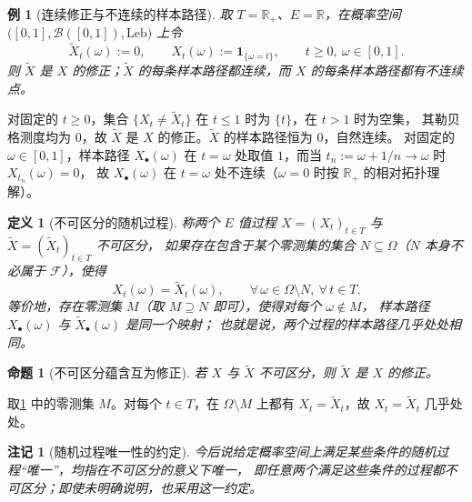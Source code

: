 \documentclass[UTF8,11pt,a4paper,oneside,fontset=fandol]{ctexrep}
\makeatletter
\numberwithin{equation}{section}
\theoremstyle{zhthm}
\newtheorem{proposition}[theorem]{命题}
\newtheorem{definition}[theorem]{定义}
\newtheorem{example}[theorem]{例}
\newtheorem{remark}[theorem]{注记}
\renewenvironment{proof}[1][\proofname]{\par
  \pushQED{\qed}%
  \normalfont\topsep6\p@\@plus6\p@\relax
  \trivlist
  \item[\hskip\labelsep\bfseries#1\hspace{0.5em}]\ignorespaces
}{%
  \popQED\endtrivlist\@endpefalse
}
\renewcommand{\proofname}{证明}
\newcommand{\R}{\mathbb{R}}
\newcommand{\B}{\mathcal{B}}
\newcommand{\F}{\mathcal{F}}
\newcommand{\Leb}{\mathrm{Leb}}
\newcommand{\ind}[1]{\mathbf{1}_{#1}}
\makeatother
\begin{document}
\begin{example}[连续修正与不连续的样本路径]
\label{ex:modification-spike-paths}
取 $T=\R_+$、$E=\R$，在概率空间 $\bigl([0,1],\B([0,1]),\Leb\bigr)$ 上令
\[
  \widetilde X_t(\omega):=0,\qquad X_t(\omega):=\ind{\{\omega=t\}},\qquad t\ge0,\ \omega\in[0,1].
\]
则 $\widetilde X$ 是 $X$ 的修正；$\widetilde X$ 的每条样本路径都连续，而 $X$ 的每条样本路径都有不连续点。
\end{example}

\begin{proof}
对固定的 $t\ge0$，集合 $\{X_t\ne\widetilde X_t\}$ 在 $t\le1$ 时为 $\{t\}$，在 $t>1$ 时为空集，
其勒贝格测度均为 $0$，故 $\widetilde X$ 是 $X$ 的修正。$\widetilde X$ 的样本路径恒为 $0$，自然连续。
对固定的 $\omega\in[0,1]$，样本路径 $X_\bullet(\omega)$ 在 $t=\omega$ 处取值 $1$，而当 $t_n:=\omega+1/n\to\omega$ 时 $X_{t_n}(\omega)=0$，
故 $X_\bullet(\omega)$ 在 $t=\omega$ 处不连续（$\omega=0$ 时按 $\R_+$ 的相对拓扑理解）。
\end{proof}

\begin{definition}[不可区分的随机过程]
\label{def:indistinguishable-processes}
称两个 $E$ 值过程 $X=(X_t)_{t\in T}$ 与 $\widetilde X=(\widetilde X_t)_{t\in T}$ 不可区分，
如果存在包含于某个零测集的集合 $N\subseteq\Omega$（$N$ 本身不必属于 $\F$），使得
\[
  X_t(\omega)=\widetilde X_t(\omega),\qquad \forall\,\omega\in\Omega\setminus N,\ \forall\,t\in T.
\]
等价地，存在零测集 $M$（取 $M\supseteq N$ 即可），使得对每个 $\omega\notin M$，
样本路径 $X_\bullet(\omega)$ 与 $\widetilde X_\bullet(\omega)$ 是同一个映射；
也就是说，两个过程的样本路径几乎处处相同。
\end{definition}

\begin{proposition}[不可区分蕴含互为修正]
\label{prop:indistinguishable-implies-modification}
若 $X$ 与 $\widetilde X$ 不可区分，则 $\widetilde X$ 是 $X$ 的修正。
\end{proposition}

\begin{proof}
取\cref{def:indistinguishable-processes} 中的零测集 $M$。对每个 $t\in T$，在 $\Omega\setminus M$ 上都有
$X_t=\widetilde X_t$，故 $X_t=\widetilde X_t$ 几乎处处。
\end{proof}

\begin{remark}[随机过程唯一性的约定]
\label{rem:process-uniqueness-convention}
今后说给定概率空间上满足某些条件的随机过程“唯一”，均指在不可区分的意义下唯一，
即任意两个满足这些条件的过程都不可区分；即使未明确说明，也采用这一约定。
\end{remark}
\end{document}
